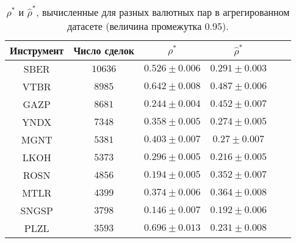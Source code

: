 \begin{table}[h!]
    \begin{center}
        \begin{tabular}{|c|c|c|c|c|c|}
            \hline
            Инструмент & Число сделок & $\rho^*$ & $\hat \rho^*$            \\ \hline
            SBER & $10636$ & $0.526 \pm 0.006$ & $0.291 \pm 0.003$ \\ \hline
            VTBR       & $8985$       & $0.642 \pm 0.008$ & $0.487 \pm 0.006$ \\ \hline
            GAZP       & $8681$       & $0.244 \pm 0.004$ & $0.452 \pm 0.007$ \\ \hline
            YNDX       & $7348$       & $0.358 \pm 0.005$ & $0.274 \pm 0.005$ \\ \hline
            MGNT       & $5381$       & $0.403 \pm 0.007$ & $0.27 \pm 0.007$  \\ \hline
            LKOH       & $5373$       & $0.296 \pm 0.005$ & $0.216 \pm 0.005$ \\ \hline
            ROSN       & $4856$       & $0.194 \pm 0.005$ & $0.352 \pm 0.007$ \\ \hline
            MTLR       & $4399$       & $0.374 \pm 0.006$ & $0.364 \pm 0.008$ \\ \hline
            SNGSP      & $3798$       & $0.146 \pm 0.007$ & $0.192 \pm 0.006$ \\ \hline
            PLZL       & $3593$       & $0.696 \pm 0.013$ & $0.231 \pm 0.008$ \\ \hline
        \end{tabular}
    \end{center}\caption{$\rho^*$ и $\hat \rho^*$, вычисленные для разных валютных пар в агрегированном датасете (величина промежутка 0.95).}
    \label{Aggreg1CU0.95} \end{table}

